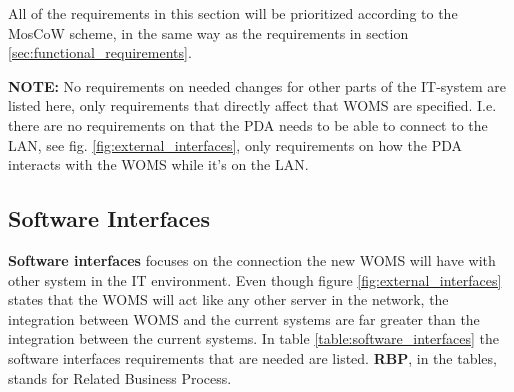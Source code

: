 All of the requirements in this section will be prioritized according to the MosCoW scheme, in the same way as the requirements in section \ref{sec:functional_requirements}.	

\textbf{NOTE:} No requirements on needed changes for other parts of the IT-system are listed here, only requirements that directly affect that WOMS are specified. I.e. there are no requirements on that the PDA needs to be able to connect to the LAN, see fig. \ref{fig:external_interfaces}, only requirements on how the PDA interacts with the WOMS while it's on the LAN.

\subsection{Software Interfaces}
\label{sub:software_interfaces}

\textbf{Software interfaces} focuses on the connection the new WOMS will have with other system in the IT environment. Even though figure \ref{fig:external_interfaces} states that the WOMS will act like any other server in the network, the integration between WOMS and the current systems are far greater than the integration between the current systems.  In table \ref{table:software_interfaces} the software interfaces requirements that are needed are listed. \textbf{RBP}, in the tables, stands for Related Business Process.

